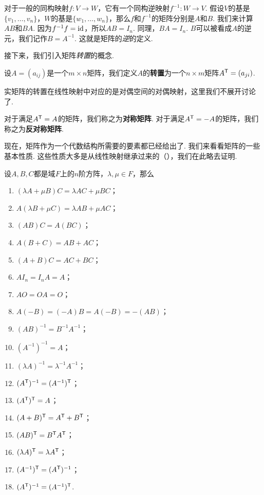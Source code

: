 对于一般的同构映射$f:V\to W$，它有一个同构逆映射$f^{-1}:W\to V$. 假设$V$的基是$\{v_1,\dots,v_n\}$，$W$的基是$\{w_1,\dots,w_n\}$，那么$f$和$f^{-1}$的矩阵分别是$A$和$B$. 我们来计算$AB$和$BA$. 因为$f^{-1}f=\mathrm{id}$，所以$AB=I_n$. 同理，$BA=I_n$. $B$可以被看成$A$的逆元，我们记作$B=A^{-1}$. 这就是矩阵的\textit{逆}的定义. 

接下来，我们引入矩阵\textit{转置}的概念. 

\begin{definition}[矩阵转置]
    设$A=(a_{ij})$是一个$m\times n$矩阵，我们定义$A$的\textbf{转置}为一个$n\times m$矩阵$A^{\mathsf{T}}=(a_{ji})$.
\end{definition}

实矩阵的转置在线性映射中对应的是对偶空间的对偶映射，这里我们不展开讨论了. 

对于满足$A^{\mathsf{T}}=A$的矩阵，我们称之为\textbf{对称矩阵}. 对于满足$A^{\mathsf{T}}=-A$的矩阵，我们称之为\textbf{反对称矩阵}. 

现在，矩阵作为一个代数结构所需要的要素都已经给出了. 我们来看看矩阵的一些基本性质. 这些性质大多是从线性映射继承过来的（），我们在此略去证明. 

\begin{proposition}\label{prop:mat-basic}
    设$A,B,C$都是域$F$上的$n$阶方阵，$\lambda,\mu\in F$，那么
    \begin{enumerate}
        \item $(\lambda A+\mu B)C=\lambda AC+\mu BC$；
        \item $A(\lambda B+\mu C)=\lambda AB+\mu AC$；
        \item $(AB)C=A(BC)$；
        \item $A(B+C)=AB+AC$；
        \item $(A+B)C=AC+BC$；
        \item $AI_n=I_nA=A$；
        \item $AO=OA=O$；
        \item $A(-B)=(-A)B=A(-B)=-(AB)$；
        \item $(AB)^{-1}=B^{-1}A^{-1}$；
        \item $(A^{-1})^{-1}=A$；
        \item $(\lambda A)^{-1}=\lambda^{-1}A^{-1}$；
        \item $(A^{\mathsf{T}} )^{-1}=(A^{-1})^{\mathsf{T}} $；
        \item $(A^{\mathsf{T}} )^{\mathsf{T}} =A$；
        \item $(A+B)^{\mathsf{T}} =A^{\mathsf{T}} +B^{\mathsf{T}} $；
        \item $(AB)^{\mathsf{T}} =B^{\mathsf{T}} A^{\mathsf{T}} $；
        \item $(\lambda A)^{\mathsf{T}} =\lambda A^{\mathsf{T}} $；
        \item $(A^{-1})^{\mathsf{T}} =(A^{\mathsf{T}} )^{-1}$；
        \item $(A^{\mathsf{T}} )^{-1}=(A^{-1})^{\mathsf{T}} $.
    \end{enumerate}
\end{proposition}

